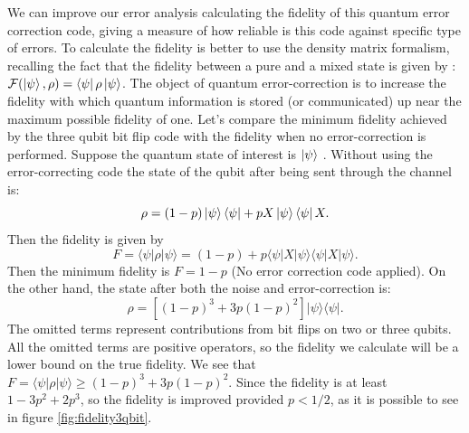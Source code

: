 We can improve our error analysis calculating the fidelity of this quantum error correction code, giving a measure of how reliable is this code against specific type of errors.
To calculate the fidelity is better to use the density matrix formalism, recalling the fact that the fidelity between a pure and a mixed state is given by :$ \mathcal{F}(\ket{\psi},\rho) = \bra{\psi}\rho\ket{\psi}$.
The object of quantum error-correction is to increase the fidelity with which quantum information is stored (or communicated) up near the maximum possible fidelity of one. Let’s compare the minimum fidelity achieved by the three qubit bit flip code with the fidelity when no error-correction is performed.
Suppose the quantum state of interest is $\ket{\psi}$ .
Without using the error-correcting code the state of the qubit after being sent through the channel is: 
\begin{equation*}
    \rho = (1-p)\ket{\psi}\bra{\psi} + p X\ket{\psi}\bra{\psi}X.
\end{equation*}
Then the fidelity is given by
$$
F=\langle\psi|\rho| \psi\rangle=(1-p)+p\langle\psi|X| \psi\rangle\langle\psi|X| \psi\rangle.
$$
Then the minimum fidelity is $F=1-p$ (No error correction code applied). %
On the other hand, the state after both the noise and error-correction is:
$$
\rho=\left[(1-p)^{3}+3 p(1-p)^{2}\right]|\psi\rangle\langle\psi|.
$$
The omitted terms represent contributions from bit flips on two or three qubits. All the omitted terms are positive operators, so the fidelity we calculate will be a lower bound on the true fidelity. We see that $F=\langle\psi|\rho| \psi\rangle \geq (1-p)^{3}+3 p(1-p)^{2}$. 
Since the fidelity is at least $1-3 p^{2}+2 p^{3}$, so the fidelity is improved provided $p <1 / 2$, as it is possible to see in figure \ref{fig:fidelity3qbit}.


